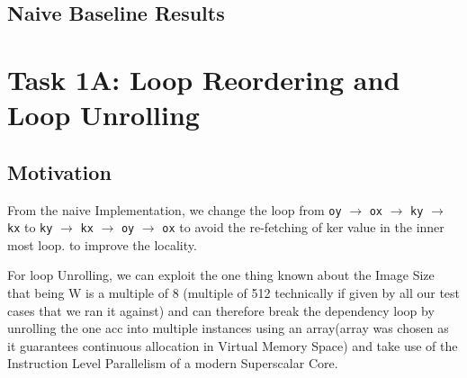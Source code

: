 \documentclass[11pt]{article}
\begin{document}
\subsection*{Naive Baseline Results}
\begin{table}[H]
  \centering
  \caption{Naive (Baseline)}
  \label{tab:naive_n8combo}
\end{table}

\section{Task 1A: Loop Reordering and Loop Unrolling}

\subsection{Motivation}
From the naive Implementation, we change the loop from \texttt{oy} $\to$ \texttt{ox} $\to$ \texttt{ky} $\to$ \texttt{kx} to \texttt{ky} $\to$ \texttt{kx} $\to$ \texttt{oy} $\to$ \texttt{ox} to avoid the re-fetching of ker value in the inner most loop. to improve the locality.

For loop Unrolling, we can exploit the one thing known about the Image Size that being W is a multiple of 8 (multiple of 512 technically if given by all our test cases that we ran it against) and can therefore break the dependency loop by unrolling the one acc into multiple instances using an array(array was chosen as it guarantees continuous allocation in Virtual Memory Space) and take use of the Instruction Level Parallelism of a modern Superscalar Core.
\end{document}
